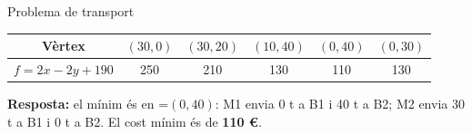\documentclass[11pt,a4paper]{article}
\newcommand{\fmm}[1]{\setbox0=\hbox{$#1$}\ifdim\wd0>\linewidth\fmdisp{#1}\else\mbox{\box0}\fi}
\newcommand{\fmdisp}[1]{\[\setbox2=\hbox{$\displaystyle #1$}\ifdim\wd2>\linewidth\resizebox{\linewidth}{!}{\box2}\else\box2\fi\]}
\begin{document}
\begin{fmex}{Problema de transport}
\begin{center}\renewcommand{\arraystretch}{1.5}\begin{tabular}{cccccc}\toprule
\textbf{Vèrtex} & \textbf{$(30,0)$} & \textbf{$(30,20)$} & \textbf{$(10,40)$} & \textbf{$(0,40)$} & \textbf{$(0,30)$}\\\midrule
\textbf{$f=2x-2y+190$} & 250 & 210 & 130 & \cellcolor{fmyellow!45}110 & 130\\
\bottomrule\end{tabular}\end{center}

\textbf{Resposta:} el mínim és en \fmm{(0,40)}: M1 envia 0 t a B1 i 40 t a B2; M2 envia 30 t a B1 i 0 t a B2. El cost mínim és de \textbf{110 €}.
\end{fmex}

\end{document}
